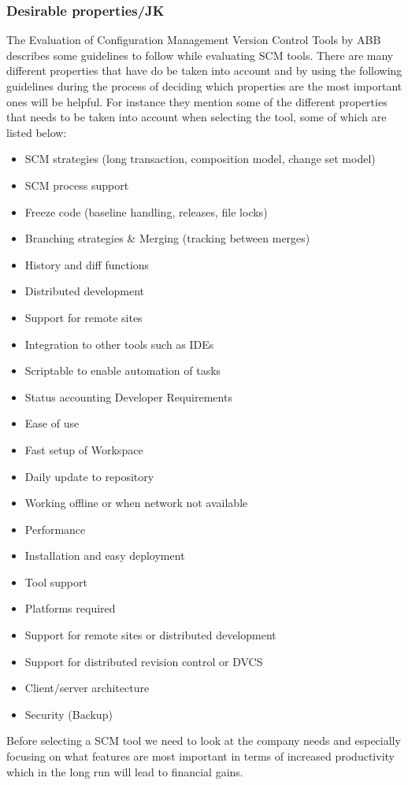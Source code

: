 \documentclass[10pt]{article}
\begin{document}
\subsubsection{Desirable properties/JK}
The Evaluation of Configuration Management Version Control Tools by ABB describes some guidelines to follow while evaluating SCM tools.
There are many different properties that have do be taken into account and by using the following guidelines during the process of deciding which properties are the most important ones will be helpful. For instance they mention some of the different properties that needs to be taken into account when selecting the tool, some of which are listed below:
\begin{itemize}
\item SCM strategies (long transaction, composition model, change set model)
\item SCM process support
\item Freeze code (baseline handling, releases, file locks)
\item Branching strategies \& Merging (tracking between merges)
\item History and diff functions
\item Distributed development
\item Support for remote sites
\item Integration to other tools such as IDEs
\item Scriptable to enable automation of tasks
\item Status accounting Developer Requirements
\item Ease of use
\item Fast setup of Workspace
\item Daily update to repository
\item Working offline or when network not available
\item Performance
\item Installation and easy deployment
\item Tool support
\item Platforms required
\item Support for remote sites or distributed development
\item Support for distributed revision control or DVCS
\item Client/server architecture
\item Security (Backup)
\end{itemize}
Before selecting a SCM tool we need to look at the company needs and especially focusing on what features are most important in terms of increased productivity which in the long run will lead to financial gains. 
\end{document}
